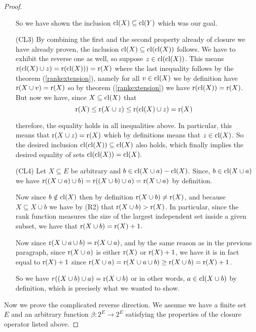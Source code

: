 \begin{proof}
\begin{enumerate}
        So we have shown the inclusion $\mathrm{cl}(X) \subseteq \mathrm{cl}(Y)$ which was our goal.

        \item[(CL3)] By combining the first and the second property already of closure we have already proven, the inclusion $\mathrm{cl}(X) \subseteq \mathrm{cl}(\mathrm{cl}(X))$  follows. We have to exhibit the reverse one as well, so suppose $z\in \mathrm{cl}(\mathrm{cl}(X))$. This means $\operatorname{r}(\mathrm{cl}(X) \cup z)= \operatorname{r}(\mathrm{cl}(X))) = \operatorname{r}(X)$ where the last inequality follows by the theorem (\ref{rankextension}), namely for all $v \in \mathrm{cl}(X)$ we by definition have $\operatorname{r}(X \cup v) = \operatorname{r}(X)$ so by theorem (\ref{rankextension}) we have $\operatorname{r}(\mathrm{cl}(X)) = \operatorname{r}(X)$. But now we have, since $X \subseteq \mathrm{cl}(X)$ that $$\operatorname{r}(X) \leq \operatorname{r}(X \cup z) \leq \operatorname{r}(\mathrm{cl}(X)\cup z) = \operatorname{r}(X)$$

       therefore, the equality holds in all inequalities above. In particular, this means that $\operatorname{r}(X \cup z) = \operatorname{r}(X)$ which by definitions means that $z \in \mathrm{cl}(X)$. So the desired inclusion $ \mathrm{cl}(\mathrm{cl}(X))\subseteq \mathrm{cl}(X)$ also holds, which finally implies the desired equality of sets $\mathrm{cl}(\mathrm{cl}(X))= \mathrm{cl}(X).$

        \item[(CL4)] Let $X \subseteq E$ be arbitrary and $b \in \mathrm{cl}(X \cup a) - \mathrm{cl}(X)$. Since, $b \in \mathrm{cl}(X \cup a)$ we have $\operatorname{r}((X\cup a)\cup b) = \operatorname{r}((X\cup b) \cup a) = \operatorname{r}(X \cup a)$ by definition. 

        Now since $b \notin \mathrm{cl}(X)$ then by definition $\operatorname{r}(X \cup b)\neq \operatorname{r}(X)$, and because $X \subseteq X \cup b$ we have by (R2) that $\operatorname{r}(X \cup b) > \operatorname{r}(X)$. In particular, since the rank function measures the size of the largest independent set inside a given subset, we have that $\operatorname{r}(X \cup b) = \operatorname{r}(X)+1.$ 

        Now since $\operatorname{r}(X \cup a \cup b) = \operatorname{r}(X \cup a)$, and by the same reason as in the previous paragraph, since $\operatorname{r}(X \cup a)$ is either $\operatorname{r}(X)$ or $\operatorname{r}(X) + 1$, we have it is in fact equal to $\operatorname{r}(X) + 1$ since $\operatorname{r}(X \cup a) = \operatorname{r}(X \cup a \cup b) \geq \operatorname{r}(X \cup b)= \operatorname{r}(X) + 1$.

        So we have $r((X\cup b) \cup a) = \operatorname{r}(X \cup b)$ or in other words, $a \in \mathrm{cl}(X \cup b)$ by definition, which is precisely what we wanted to show.
       
        \end{enumerate}



    Now we prove the complicated reverse direction. We assume we have a finite set $E$ and an arbitrary function $\beta : 2^E \to 2^E$ satisfying the properties of the closure operator listed above.


\end{proof}
